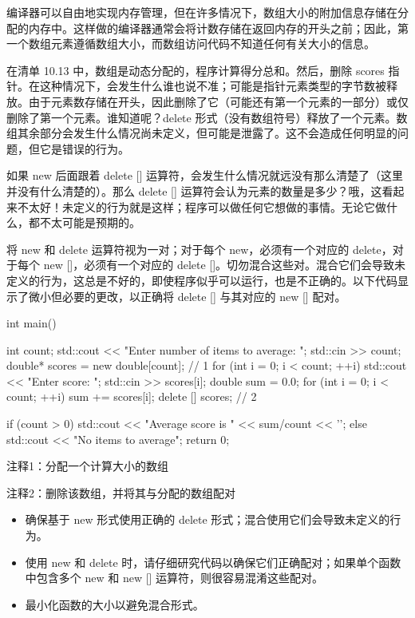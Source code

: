 编译器可以自由地实现内存管理，但在许多情况下，数组大小的附加信息存储在分配的内存中。这样做的编译器通常会将计数存储在返回内存的开头之前；因此，第一个数组元素遵循数组大小，而数组访问代码不知道任何有关大小的信息。

在清单 10.13 中，数组是动态分配的，程序计算得分总和。然后，删除 scores 指针。在这种情况下，会发生什么谁也说不准；可能是指针元素类型的字节数被释放。由于元素数存储在开头，因此删除了它（可能还有第一个元素的一部分）或仅删除了第一个元素。谁知道呢？delete 形式（没有数组符号）释放了一个元素。数组其余部分会发生什么情况尚未定义，但可能是泄露了。这不会造成任何明显的问题，但它是错误的行为。

如果 new 后面跟着 delete [] 运算符，会发生什么情况就远没有那么清楚了（这里并没有什么清楚的）。那么 delete [] 运算符会认为元素的数量是多少？哦，这看起来不太好！未定义的行为就是这样；程序可以做任何它想做的事情。无论它做什么，都不太可能是预期的。


将 new 和 delete 运算符视为一对；对于每个 new，必须有一个对应的 delete，对于每个 new []，必须有一个对应的 delete []。切勿混合这些对。混合它们会导致未定义的行为，这总是不好的，即使程序似乎可以运行，也是不正确的。以下代码显示了微小但必要的更改，以正确将 delete [] 与其对应的 new [] 配对。


\begin{cpp}
int main() {
  int count;
  std::cout << "Enter number of items to average: ";
  std::cin >> count;
  double* scores = new double[count]; // 1
  for (int i = 0; i < count; ++i) {
    std::cout << "Enter score: ";
    std::cin >> scores[i];
  }
  double sum = 0.0;
  for (int i = 0; i < count; ++i)
    sum += scores[i];
  delete [] scores; // 2

  if (count > 0)
    std::cout << "Average score is " << sum/count << '\n';
  else
    std::cout << "No items to average\n";
  return 0;
}
\end{cpp}

{\footnotesize
注释1：分配一个计算大小的数组

注释2：删除该数组，并将其与分配的数组配对
}


\begin{itemize}
\item
确保基于 new 形式使用正确的 delete 形式；混合使用它们会导致未定义的行为。

\item
使用 new 和 delete 时，请仔细研究代码以确保它们正确配对；如果单个函数中包含多个 new 和 new [] 运算符，则很容易混淆这些配对。

\item
最小化函数的大小以避免混合形式。
\end{itemize}






